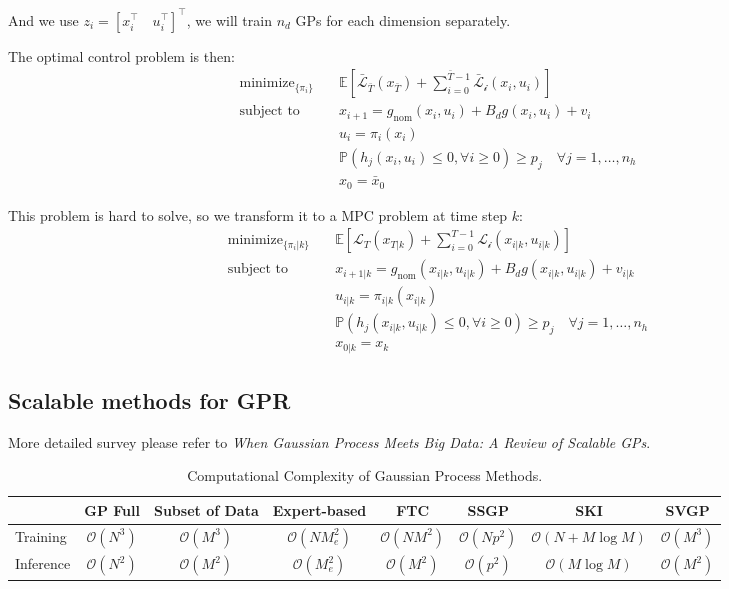 \documentclass[10pt]{elegantbook}
\begin{document}
And we use $z_i = [x_i^{\top} \quad u_i^{\top}]^{\top}$, we will train $n_d$ GPs for each dimension separately.

The optimal control problem is then:
\begin{align}
    \text{minimize}_{\{\pi_i\}} \quad & \mathbb{E} \left[ \bar{\mathcal{L}}_{\bar T}(x_{\bar T}) + \sum_{i=0}^{\bar T-1} \mathcal{\bar L_i}(x_i, u_i) \right] \\
    \text{subject to} \quad & x_{i+1} = g_{\text{nom}}(x_i, u_i) + B_d g(x_i, u_i) + v_i \\
    & u_i = \pi_i(x_i) \\
    & \mathbb{P}(h_j(x_i, u_i) \leq 0, \forall i \geq 0) \geq p_j \quad \forall j=1,\ldots,n_h \\
    & x_0 = \bar{x}_0
\end{align}

This problem is hard to solve, so we transform it to a MPC problem at time step $k$:
\begin{align}
    \text{minimize}_{\{\pi_i | k\}} \quad & \mathbb{E} \left[ \mathcal{L}_{T}(x_{T|k}) + \sum_{i=0}^{T-1} \mathcal{L_i}(x_{i|k}, u_{i|k}) \right] \\
    \text{subject to} \quad & x_{i+1|k} = g_{\text{nom}}(x_{i|k}, u_{i|k}) + B_d g(x_{i|k}, u_{i|k}) + v_{i|k} \\
    & u_{i|k} = \pi_{i|k}(x_{i|k}) \\
    & \mathbb{P}(h_j(x_{i|k}, u_{i|k}) \leq 0, \forall i \geq 0) \geq p_j \quad \forall j=1,\ldots,n_h \\
    & x_{0|k} = x_k
\end{align}

\subsection{Scalable methods for GPR}
More detailed survey please refer to \textit{When Gaussian Process Meets Big Data: A Review of Scalable GPs}.

\begin{table}[ht]
\centering
\caption{Computational Complexity of Gaussian Process Methods.}
\begin{tabular}{lccccccc}
\toprule
& GP Full & Subset of Data & Expert-based & FTC & SSGP & SKI & SVGP \\
\midrule
Training  & $\mathcal O(N^3)$ & $\mathcal O(M^3)$ & $\mathcal O(NM_e^2)$ & $\mathcal O(NM^2)$ & $\mathcal O(Np^2)$ & $\mathcal O(N + M \log M)$ & $\mathcal O(M^3)$ \\
Inference & $\mathcal O(N^2)$ & $\mathcal O(M^2)$ & $\mathcal O(M_e^2)$  & $\mathcal O(M^2)$  & $\mathcal O(p^2)$  & $\mathcal O(M \log M)$     & $\mathcal O(M^2)$ \\
\bottomrule
\end{tabular}
\end{table}
\end{document}
